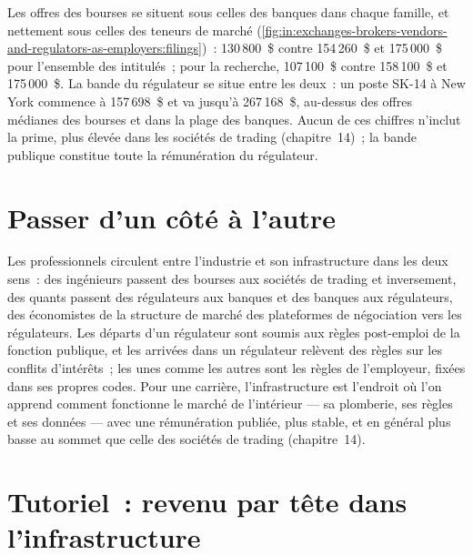 Les offres des bourses se situent sous celles des banques dans chaque famille, et nettement sous celles des teneurs de marché
(\cref{fig:in:exchanges-brokers-vendors-and-regulators-as-employers:filings})~: 130\,800~\$ contre 154\,260~\$ et
175\,000~\$ pour l'ensemble des intitulés~; pour la recherche, 107\,100~\$ contre 158\,100~\$ et 175\,000~\$. La bande du régulateur se situe entre les deux~:
un poste SK-14 à New York commence à 157\,698~\$ et va jusqu'à 267\,168~\$, au-dessus des offres médianes des bourses et dans
la plage des banques. Aucun de ces chiffres n'inclut la prime, plus élevée dans les sociétés de trading (chapitre~14)~; la bande publique
constitue toute la rémunération du régulateur.

\section{Passer d'un côté à l'autre}

Les professionnels circulent entre l'industrie et son infrastructure dans les deux sens~: des ingénieurs passent des bourses aux sociétés de trading
et inversement, des quants passent des régulateurs aux banques et des banques aux régulateurs, des économistes de la structure de marché des plateformes
de négociation vers les régulateurs. Les départs d'un régulateur sont soumis aux règles post-emploi de la fonction publique, et les arrivées dans un régulateur relèvent des règles sur les
conflits d'intérêts~; les unes comme les autres sont les règles de l'employeur, fixées dans ses propres codes. Pour une carrière, l'infrastructure est
l'endroit où l'on apprend comment fonctionne le marché de l'intérieur --- sa plomberie, ses règles et ses données --- avec une rémunération
publiée, plus stable, et en général plus basse au sommet que celle des sociétés de trading (chapitre~14).

\section{Tutoriel~: revenu par tête dans l'infrastructure}\label{tut:in:exchanges-brokers-vendors-and-regulators-as-employers:tut}

